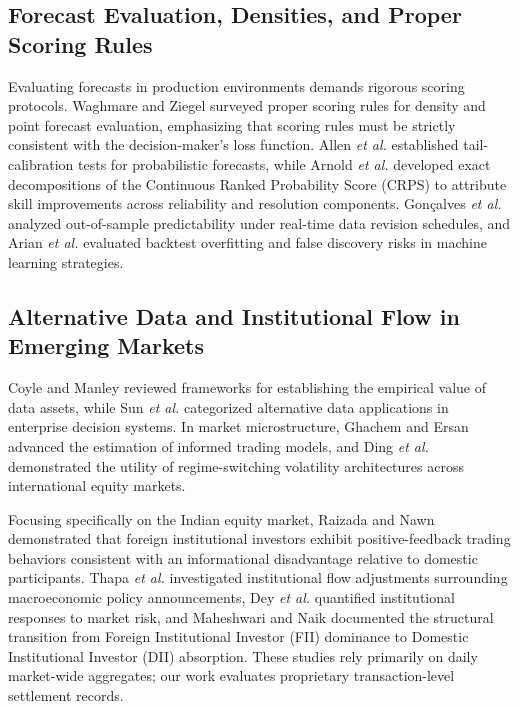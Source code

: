 \documentclass{ieeeaccess}
\begin{document}
\subsection{Forecast Evaluation, Densities, and Proper Scoring Rules}
Evaluating forecasts in production environments demands rigorous scoring protocols. Waghmare and Ziegel \cite{waghmare2026proper} surveyed proper scoring rules for density and point forecast evaluation, emphasizing that scoring rules must be strictly consistent with the decision-maker's loss function. Allen \textit{et al.} \cite{allen2025tail} established tail-calibration tests for probabilistic forecasts, while Arnold \textit{et al.} \cite{arnold2024decompositions} developed exact decompositions of the Continuous Ranked Probability Score (CRPS) to attribute skill improvements across reliability and resolution components. Gon{\c{c}}alves \textit{et al.} \cite{goncalves2025bootstrapping} analyzed out-of-sample predictability under real-time data revision schedules, and Arian \textit{et al.} \cite{arian2024backtest} evaluated backtest overfitting and false discovery risks in machine learning strategies.

\subsection{Alternative Data and Institutional Flow in Emerging Markets}
Coyle and Manley \cite{coyle2024is} reviewed frameworks for establishing the empirical value of data assets, while Sun \textit{et al.} \cite{sun2024alternative} categorized alternative data applications in enterprise decision systems. In market microstructure, Ghachem and Ersan \cite{ghachem2025estimation} advanced the estimation of informed trading models, and Ding \textit{et al.} \cite{ding2025forecasting} demonstrated the utility of regime-switching volatility architectures across international equity markets.

Focusing specifically on the Indian equity market, Raizada and Nawn \cite{raizada2025trade} demonstrated that foreign institutional investors exhibit positive-feedback trading behaviors consistent with an informational disadvantage relative to domestic participants. Thapa \textit{et al.} \cite{thapa2026policy} investigated institutional flow adjustments surrounding macroeconomic policy announcements, Dey \textit{et al.} \cite{dey2024study} quantified institutional responses to market risk, and Maheshwari and Naik \cite{maheshwari2026fii} documented the structural transition from Foreign Institutional Investor (FII) dominance to Domestic Institutional Investor (DII) absorption. These studies rely primarily on daily market-wide aggregates; our work evaluates proprietary transaction-level settlement records.
\end{document}

